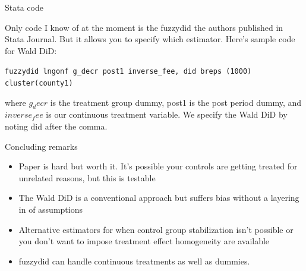 \documentclass{beamer}
\begin{document}
\begin{frame}{Stata code}

Only code I know of at the moment is the fuzzydid the authors published in Stata Journal.  But it allows you to specify which estimator.  Here's sample code for Wald DiD:

\bigskip

\texttt{fuzzydid lngonf g_decr post1 inverse_fee, did breps (1000) cluster(county1)}

where $g_decr$ is the treatment group dummy, post1 is the post period dummy, and $inverse_fee$ is our continuous treatment variable. We specify the Wald DiD by noting did after the comma.

\end{frame}

\begin{frame}{Concluding remarks}

\begin{itemize}
\item Paper is hard but worth it.  It's possible your controls are getting treated for unrelated reasons, but this is testable
\item The Wald DiD is a conventional approach but suffers bias without a layering in of assumptions
\item Alternative estimators for when control group stabilization isn't possible or you don't want to impose treatment effect homogeneity are available
\item fuzzydid can handle continuous treatments as well as dummies.
\end{itemize}

\end{frame}
\end{document}

